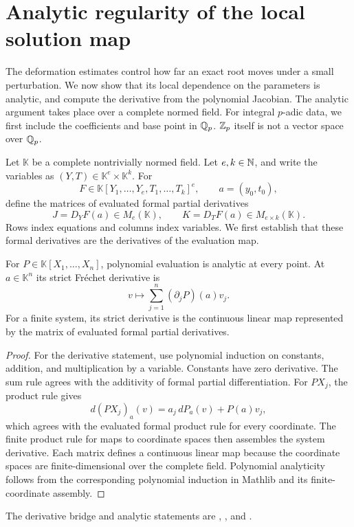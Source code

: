 \section{Analytic regularity of the local solution map}
\label{sec:regularity}
The deformation estimates control how far an exact root moves under a small
perturbation. We now show that its local dependence on the parameters is
analytic, and compute the derivative from the polynomial Jacobian. The
analytic argument takes place over a complete normed field. For integral
$p$-adic data, we first include the coefficients and base point in $\mathbb Q_p$.
$\mathbb Z_p$ itself is not a vector space over $\mathbb Q_p$.

Let $\mathbb K$ be a complete nontrivially normed field. Let $e,k\in\mathbb N$, and
write the variables as $(Y,T)\in\mathbb K^e\times\mathbb K^k$. For
\[
 F\in\mathbb K[Y_1,\ldots,Y_e,T_1,\ldots,T_k]^e,
 \qquad a=(y_0,t_0),
\]
define the matrices of evaluated formal partial derivatives
\begin{equation}
 J=D_YF(a)\in M_e(\mathbb K),\qquad
 K=D_TF(a)\in M_{e\times k}(\mathbb K).
 \label{eq:regularity-blocks}
\end{equation}
Rows index equations and columns index variables. We first establish that
these formal derivatives are the derivatives of the evaluation map.

\begin{lemma}
\label{lem:actual-polynomial-derivative}
For $P\in\mathbb K[X_1,\ldots,X_n]$, polynomial evaluation is analytic at
every point. At $a\in\mathbb K^n$ its strict Fr\'echet derivative is
\[
 v\longmapsto\sum_{j=1}^n (\partial_jP)(a)v_j.
\]
For a finite system, its strict derivative is the continuous linear map
represented by the matrix of evaluated formal partial derivatives.
\end{lemma}
\begin{proof}
For the derivative statement, use polynomial induction on constants,
addition, and multiplication by a variable. Constants have zero derivative.
The sum rule agrees with the additivity of formal partial differentiation.
For $PX_j$, the product rule gives
\[
 d(PX_j)_a(v)=a_j\,dP_a(v)+P(a)v_j,
\]
which agrees with the evaluated formal product rule for every coordinate.
The finite product rule for maps to coordinate spaces then assembles the
system derivative. Each matrix defines a continuous linear map because the
coordinate spaces are finite-dimensional over the complete field.
Polynomial analyticity follows from the corresponding polynomial induction
in Mathlib and its finite-coordinate assembly.
\end{proof}
The derivative bridge and analytic statements are
,
, and
.

